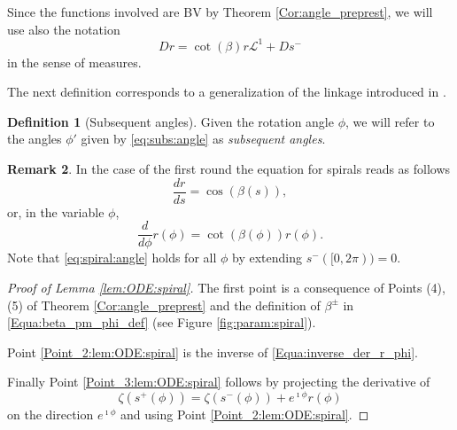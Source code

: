 \documentclass[reqno]{amsart}
\theoremstyle{definition} \newtheorem{definition}{Definition}[section]
\theoremstyle{definition} \newtheorem{remark}[definition]{Remark}
\theoremstyle{plain} \newtheorem{lemma}[definition]{Lemma}
\theoremstyle{plain} \newtheorem{proposition}[definition]{Proposition}
\theoremstyle{plain} \newtheorem{theorem}[definition]{Theorem}
\theoremstyle{plain} \newtheorem{corollary}[definition]{Corollary}
\theoremstyle{definition} \newtheorem{example}[definition]{Example}
\theoremstyle{plain} \newtheorem{claim}[clai]{Claim}
\theoremstyle{definition} \newtheorem{assumption}[definition]{Assumption}
\theoremstyle{definition} \newtheorem{observation}[definition]{Observation}
\newcommand{\1}{\mathbbm 1}
\renewcommand{\i}{\imath}
\numberwithin{equation}{section} %
\theoremstyle{plain} \newtheorem*{theorem*}{Theorem}
\theoremstyle{plain} \newtheorem{mthm}[maintheorem]{Main Theorem}
\theoremstyle{plain} \newtheorem*{mthm*}{Main Theorem}
\theoremstyle{plain} \newtheorem*{conjecture*}{Conjecture}
\theoremstyle{plain} \newtheorem{conjecture}[definition]{Conjecture}
\theoremstyle{plain} \newtheorem*{problem*}{Problem}
\begin{document}
Since the functions involved are BV by Theorem \ref{Cor:angle_preprest}, we will use also the notation
\begin{equation*}
Dr = \cot(\beta) r \mathscr L^1 + Ds^-
\end{equation*}
in the sense of measures.

The next definition corresponds to a generalization of the linkage introduced in \cite{firefighter}.

\begin{definition}[Subsequent angles]
\label{Def:subsequent_angles}
Given the rotation angle $\phi$, we will refer to the angles $\phi'$ given by \eqref{eq:subs:angle} as \emph{subsequent angles}.
\end{definition}

\begin{remark}
In the case of the first round  the equation for spirals reads as follows
\begin{equation}\label{eq:spiral:first:round}
\frac{dr}{ds}=\cos(\beta(s)),
\end{equation}
or, in the variable $\phi$,
\begin{equation*}
\frac{d}{d\phi}r(\phi)=\cot(\beta(\phi))r(\phi).
\end{equation*}
Note that \eqref{eq:spiral:angle} holds for all $\phi$ by extending $s^-([0,2\pi)) = 0$.
\end{remark}


\begin{proof}[Proof of Lemma \ref{lem:ODE:spiral}]
The first point is a consequence of Points (4),(5) of Theorem \ref{Cor:angle_preprest} and the definition of $\beta^\pm$ in \eqref{Equa:beta_pm_phi_def} (see Figure  \ref{fig:param:spiral}).

Point \eqref{Point_2:lem:ODE:spiral} is the inverse of \eqref{Equa:inverse_der_r_phi}.

Finally Point \eqref{Point_3:lem:ODE:spiral} follows by projecting the derivative of
\begin{equation*}
\zeta(s^+(\phi)) = \zeta(s^-(\phi)) + e^{\i \phi} r(\phi)
\end{equation*}
on the direction $e^{\i \phi}$ and using Point \eqref{Point_2:lem:ODE:spiral}.
\end{proof}
\end{document}
